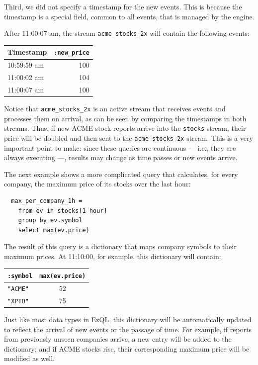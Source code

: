 \documentclass[a4,11pt]{report}
\begin{document}
Third, we did not specify a timestamp for the new events. This is
because the timestamp is a special field, common to all events, that
is managed by the engine.

After 11:00:07 am, the stream \verb=acme_stocks_2x= will contain the
following events:

\begin{tabular}{ |l|r| }
  \hline
  Timestamp & \verb=:new_price= \\
  \hline
  10:59:59 am & 100 \\
  11:00:02 am & 104 \\
  11:00:07 am & 100 \\
  \hline
\end{tabular}

Notice that \verb=acme_stocks_2x= is an active stream that receives
events and processes them on arrival, as can be seen by comparing the
timestamps in both streams. Thus, if new ACME stock reports arrive
into the \verb=stocks= stream, their price will be doubled and then
sent to the \verb=acme_stocks_2x= stream. This is a very important
point to make: since these queries are continuous --- i.e., they are
always executing ---, results may change as time passes or new events
arrive.

The next example shows a more complicated query that calculates, for
every company, the maximum price of its stocks over the last hour:

\begin{lstlisting}
  max_per_company_1h =
    from ev in stocks[1 hour]
    group by ev.symbol
    select max(ev.price)
\end{lstlisting}

The result of this query is a dictionary that maps company symbols to
their maximum prices. At 11:10:00, for example, this dictionary will
contain:

\begin{tabular}{ |l|c| }
  \hline
  \verb=:symbol= & \verb=max(ev.price)= \\
  \hline
  \verb="ACME"= & 52 \\
  \verb="XPTO"= & 75 \\
  \hline
\end{tabular}

Just like most data types in EzQL, this dictionary will be
automatically updated to reflect the arrival of new events or the
passage of time. For example, if reports from previously unseen
companies arrive, a new entry will be added to the dictionary; and if
ACME stocks rise, their corresponding maximum price will be modified
as well.
\end{document}
